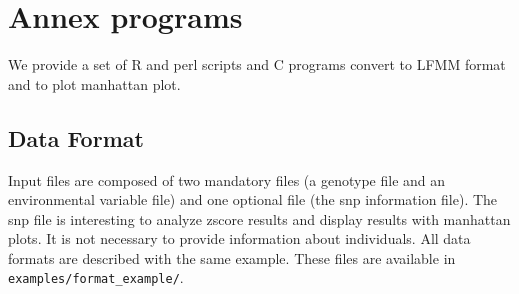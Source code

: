 \documentclass[10pt,a4paper]{article}
\begin{document}
\section{Annex programs}

We provide a set of R and perl scripts and C programs convert to LFMM format and to plot manhattan plot.

\subsection{Data Format}
Input files are composed of two mandatory files (a genotype file and an environmental variable file)
and one optional file (the snp information file). The snp file is interesting to analyze zscore
results and display results with manhattan plots.
It is not necessary to provide information about individuals.
All data formats are described with the same
example. These files are available in \verb|examples/format_example/|.
\end{document}

